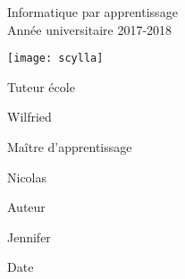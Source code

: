 

{
	\BgThispage
	\thispagestyle{couverture}
	
	
	\makeatletter
	{\LARGE\bfseries\@title\par}
	{\color{aqua}Informatique par apprentissage \\
	\color{aqua}Année universitaire 2017-2018}
	\hfill
	\vspace{0.5cm}
	
	\texttt{[image: scylla]}
	\vspace{0.5cm}
	
	\begin{minipage}[c]{0.5\textwidth}
	Tuteur école \par
	{\color{aqua} Wilfried }
	
	\vspace{0.5cm}
	
	Maître d'apprentissage \par
	{\color{aqua} Nicolas }
	\end{minipage}
	\begin{minipage}[c]{0.5\textwidth}
	Auteur \par
	{\color{aqua} Jennifer }
	
	\vspace{0.5cm}
	
	Date \par
	{\color{aqua} \@date}
	\end{minipage}
	
		
		
	
	\makeatother
	
	\vfill
	
	\afterpage{\blankpage}
	\restoregeometry
}